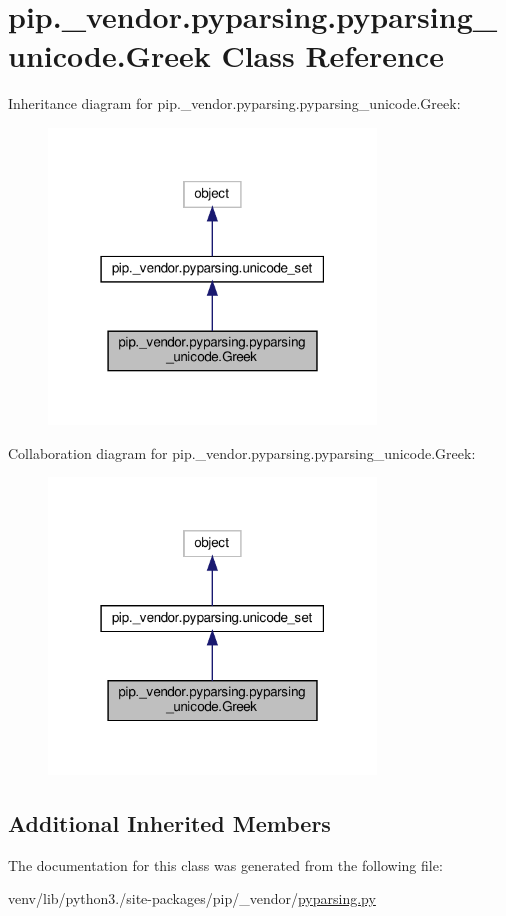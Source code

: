 \hypertarget{classpip_1_1__vendor_1_1pyparsing_1_1pyparsing__unicode_1_1Greek}{}\section{pip.\+\_\+vendor.\+pyparsing.\+pyparsing\+\_\+unicode.\+Greek Class Reference}
\label{classpip_1_1__vendor_1_1pyparsing_1_1pyparsing__unicode_1_1Greek}


Inheritance diagram for pip.\+\_\+vendor.\+pyparsing.\+pyparsing\+\_\+unicode.\+Greek\+:
\nopagebreak
\begin{figure}[H]
\begin{center}
\leavevmode
\includegraphics[width=247pt]{classpip_1_1__vendor_1_1pyparsing_1_1pyparsing__unicode_1_1Greek__inherit__graph}
\end{center}
\end{figure}


Collaboration diagram for pip.\+\_\+vendor.\+pyparsing.\+pyparsing\+\_\+unicode.\+Greek\+:
\nopagebreak
\begin{figure}[H]
\begin{center}
\leavevmode
\includegraphics[width=247pt]{classpip_1_1__vendor_1_1pyparsing_1_1pyparsing__unicode_1_1Greek__coll__graph}
\end{center}
\end{figure}
\subsection*{Additional Inherited Members}


The documentation for this class was generated from the following file\+:\begin{DoxyCompactItemize}
\item 
venv/lib/python3./site-\/packages/pip/\+\_\+vendor/\hyperlink{pip_2__vendor_2pyparsing_8py}{pyparsing.\+py}\end{DoxyCompactItemize}
